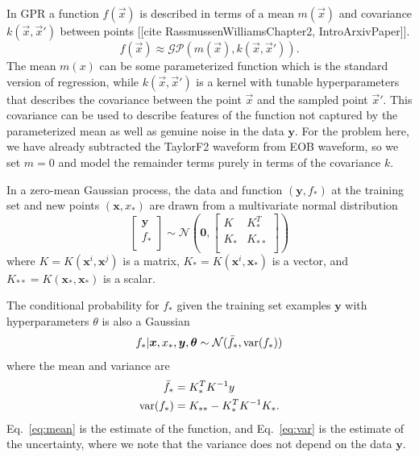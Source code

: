 \documentclass[prd,aps,letter,twocolumn,floatfix,notitlepage,nofootinbib]{revtex4-1}
\begin{document}
In GPR a function $f(\vec x)$ is described in terms of a mean $m(\vec x)$ and  covariance $k(\vec x, \vec x')$ between points [[cite RassmussenWilliamsChapter2, IntroArxivPaper]].
\begin{equation}
f(\vec x) \approx \mathcal{GP}(m(\vec x), k(\vec x, \vec x')).
\end{equation}
The mean $m(x)$ can be some parameterized function which is the standard version of regression, while $k(\vec x, \vec x')$ is a kernel with tunable hyperparameters that describes the covariance between the point $\vec x$ and the sampled point $\vec x'$. This covariance can be used to describe features of the function not captured by the parameterized mean as well as genuine noise in the data ${\bm y}$. For the problem here, we have already subtracted the TaylorF2 waveform from EOB waveform, so we set $m=0$ and model the remainder terms purely in terms of the covariance $k$. 

In a zero-mean Gaussian process, the data and function $({\bm y}, f_*)$ at the training set and new points $({\bm x}, x_*)$ are drawn from a multivariate normal distribution
\begin{equation}
\label{eq:gaussian}
\begin{bmatrix}
{\bm y} \\
f_* \\
\end{bmatrix}
\sim \mathcal{N}
\left({\bm 0}, 
\begin{bmatrix}
K & K_*^T \\
K_* & K_{**} \\
\end{bmatrix}
\right)
\end{equation}
where $K = K({\bm x}^i, {\bm x}^j)$ is a matrix, $K_* = K({\bm x}^i, {\bm x}_*)$ is a vector, and $K_{**} = K({\bm x}_*, {\bm x}_*)$ is a scalar.

The conditional probability for $f_*$ given the training set examples ${\bm y}$ with hyperparameters $\theta$ is also a Gaussian
\begin{equation}
f_* | {\bm x}, x_*, {\bm y}, {\bm \theta} \sim \mathcal{N}(\bar f_*, {\rm var}(f_*))
\end{equation}
where the mean and variance are
\begin{align}
\label{eq:mean}
\bar f_* &= K_*^T K^{-1} y \\
\label{eq:var}
{\rm var}(f_*) &= K_{**} - K_*^T K^{-1} K_*.
\end{align}
Eq.~\eqref{eq:mean} is the estimate of the function, and Eq.~\eqref{eq:var} is the estimate of the uncertainty, where we note that the variance does not depend on the data $\bm{y}$.
\end{document}
